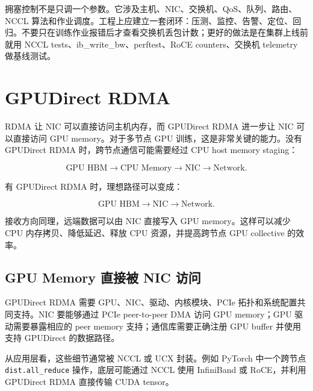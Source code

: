拥塞控制不是只调一个参数。它涉及主机、NIC、交换机、QoS、队列、路由、NCCL 算法和作业调度。工程上应建立一套闭环：压测、监控、告警、定位、回归。不要只在训练作业报错后才查看交换机丢包计数；更好的做法是在集群上线前就用 NCCL tests、ib\_write\_bw、perftest、RoCE counters、交换机 telemetry 做基线测试。

\section{GPUDirect RDMA}
\label{sec:gpudirect-rdma}

RDMA 让 NIC 可以直接访问主机内存，而 GPUDirect RDMA 进一步让 NIC 可以直接访问 GPU memory。对于多节点 GPU 训练，这是非常关键的能力。没有 GPUDirect RDMA 时，跨节点通信可能需要经过 CPU host memory staging：

\[
  \text{GPU HBM} \rightarrow \text{CPU Memory} \rightarrow \text{NIC} \rightarrow \text{Network}.
\]

有 GPUDirect RDMA 时，理想路径可以变成：

\[
  \text{GPU HBM} \rightarrow \text{NIC} \rightarrow \text{Network}.
\]

接收方向同理，远端数据可以由 NIC 直接写入 GPU memory。这样可以减少 CPU 内存拷贝、降低延迟、释放 CPU 资源，并提高跨节点 GPU collective 的效率。

\subsection{GPU Memory 直接被 NIC 访问}
\label{subsec:nic-access-gpu-memory}

GPUDirect RDMA 需要 GPU、NIC、驱动、内核模块、PCIe 拓扑和系统配置共同支持。NIC 要能够通过 PCIe peer-to-peer DMA 访问 GPU memory；GPU 驱动需要暴露相应的 peer memory 支持；通信库需要正确注册 GPU buffer 并使用支持 GPUDirect 的数据路径。

从应用层看，这些细节通常被 NCCL 或 UCX 封装。例如 PyTorch 中一个跨节点 \texttt{dist.all\_reduce} 操作，底层可能通过 NCCL 使用 InfiniBand 或 RoCE，并利用 GPUDirect RDMA 直接传输 CUDA tensor。

